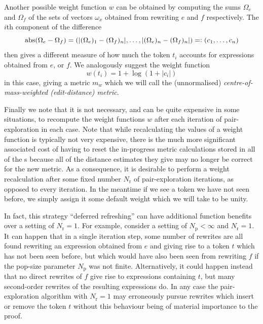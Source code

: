 \documentclass[12pt]{easychair}
\begin{document}
Another possible weight function $w$ can be obtained by computing the sums $\Omega_e$ and $\Omega_f$ of the sets of vectors $\omega_x$ obtained from rewriting $e$ and $f$ respectively. The $i$th component of the difference
\begin{equation*}
  \operatorname{abs}(\Omega_e - \Omega_f) = (\lvert (\Omega_e)_1 - (\Omega_f)_n \rvert, \ldots, \lvert (\Omega_e)_n - (\Omega_f)_n \rvert) =: (c_1, \ldots, c_n)
\end{equation*}
then gives a different measure of how much the token $t_i$ accounts for expressions obtained from $e$, or $f$. We analogously suggest the weight function
\begin{equation*}
  w(t_i) = 1 + \log(1 + \lvert c_i \rvert)
\end{equation*}
in this case, giving a metric $m_w$ which we will call the (unnormalised) \textit{centre-of-mass-weighted (edit-distance) metric}.

Finally we note that it is not necessary, and can be quite expensive in some situations, to recompute the weight functions $w$ after each iteration of pair-exploration in each case. Note that while recalculating the values of a weight function is typically not very expensive, there is the much more significant associated cost of having to reset the in-progress metric calculations stored in all of the s because all of the distance estimates they give may no longer be correct for the new metric. As a consequence, it is desirable to perform a weight recalculation after some fixed number $N_\text{r}$ of pair-exploration iterations, as opposed to every iteration. In the meantime if we see a token we have not seen before, we simply assign it some default weight which we will take to be unity.

In fact, this strategy ``deferred refreshing'' can have additional function benefits over a setting of $N_\text{r} = 1$. For example, consider a setting of $N_\text{p} < \infty$ and $N_\text{r} = 1$. It can happen that in a single iteration step, some number of rewrites are all found rewriting an expression obtained from $e$ and giving rise to a token $t$ which has not been seen before, but which would have also been seen from rewriting $f$ if the pop-size parameter $N_\text{p}$ was not finite. Alternatively, it could happen instead that no direct rewrites of $f$ give rise to expressions containing $t$, but many second-order rewrites of the resulting expressions do. In any case the pair-exploration algorithm with $N_\text{r} = 1$ may erroneously pursue rewrites which insert or remove the token $t$ without this behaviour being of material importance to the proof.
\end{document}
